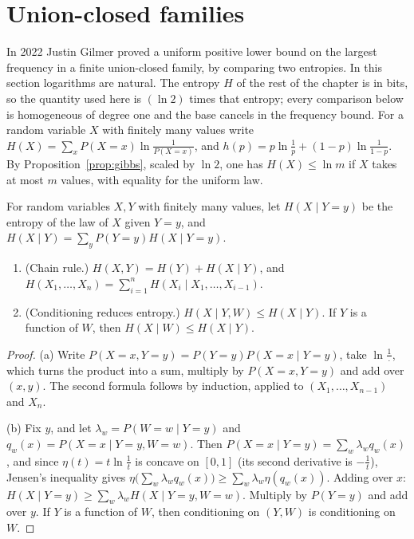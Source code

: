 \section{Union-closed families}

In 2022 Justin Gilmer proved a uniform positive lower bound on the largest frequency in a finite union-closed family, by comparing two entropies. In this section logarithms are natural. The entropy $H$ of the rest of the chapter is in bits, so the quantity used here is $(\ln 2)$ times that entropy; every comparison below is homogeneous of degree one and the base cancels in the frequency bound. For a random variable $X$ with finitely many values write $H(X)=\sum_xP(X=x)\ln\frac1{P(X=x)}$, and $h(p)=p\ln\frac1p+(1-p)\ln\frac1{1-p}$. By Proposition~\ref{prop:gibbs}, scaled by $\ln 2$, one has $H(X)\le\ln m$ if $X$ takes at most $m$ values, with equality for the uniform law.

For random variables $X,Y$ with finitely many values, let $H(X\mid Y=y)$ be the entropy of the law of $X$ given $Y=y$, and
$H(X\mid Y)=\sum_yP(Y=y)H(X\mid Y=y)$.

\begin{lemma}\label{conjectures:lem:condent}
\begin{enumerate}[label=(\alph*)]
\item (Chain rule.) $H(X,Y)=H(Y)+H(X\mid Y)$, and $H(X_1,\dots,X_n)=\sum_{i=1}^nH(X_i\mid X_1,\dots,X_{i-1})$.
\item (Conditioning reduces entropy.) $H(X\mid Y,W)\le H(X\mid Y)$. If $Y$ is a function of $W$, then $H(X\mid W)\le H(X\mid Y)$.
\end{enumerate}
\end{lemma}
\begin{proof}
(a) Write $P(X=x,Y=y)=P(Y=y)P(X=x\mid Y=y)$, take $\ln\frac1{\,\cdot\,}$, which turns the product into a sum, multiply by $P(X=x,Y=y)$ and add over
$(x,y)$. The second formula follows by induction, applied to $(X_1,\dots,X_{n-1})$ and $X_n$.

(b) Fix $y$, and let $\lambda_w=P(W=w\mid Y=y)$ and $q_w(x)=P(X=x\mid Y=y,W=w)$. Then $P(X=x\mid Y=y)=\sum_w\lambda_wq_w(x)$, and since
$\eta(t)=t\ln\frac1t$ is concave on $[0,1]$ (its second derivative is $-\frac1t$), Jensen's inequality gives
$\eta\bigl(\sum_w\lambda_wq_w(x)\bigr)\ge\sum_w\lambda_w\eta(q_w(x))$. Adding over $x$: $H(X\mid Y=y)\ge\sum_w\lambda_wH(X\mid Y=y,W=w)$. Multiply by
$P(Y=y)$ and add over $y$. If $Y$ is a function of $W$, then conditioning on $(Y,W)$ is conditioning on $W$.
\end{proof}

